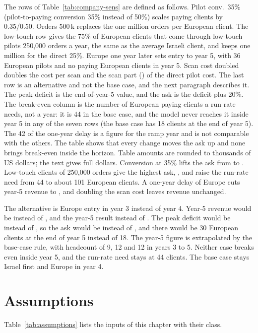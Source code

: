The rows of Table~\ref{tab:company-sens} are defined as follows. Pilot conv.\ 35\% (pilot-to-paying conversion 35\% instead of 50\%) scales paying clients by 0.35/0.50. Orders 500\,k replaces the one million orders per European client. The low-touch row gives the 75\% of European clients that come through low-touch pilots 250,000 orders a year, the same as the average Israeli client, and keeps one million for the direct 25\%. Europe one year later sets entry to year 5, with 36 European pilots and no paying European clients in year 5. Scan cost doubled doubles the cost per scan and the scan part () of the direct pilot cost. The last row is an alternative and not the base case, and the next paragraph describes it. The peak deficit is the end-of-year-5 value, and the ask is the deficit plus 20\%. The break-even column is the number of European paying clients a run rate needs, not a year: it is 44 in the base case, and the model never reaches it inside year 5 in any of the seven rows (the base case has 18 clients at the end of year 5). The 42 of the one-year delay is a figure for the ramp year and is not comparable with the others. The table shows that every change moves the ask up and none brings break-even inside the horizon. Table amounts are rounded to thousands of US dollars; the text gives full dollars. Conversion at 35\% lifts the ask from  to . Low-touch clients of 250,000 orders give the highest ask, , and raise the run-rate need from 44 to about 101 European clients. A one-year delay of Europe cuts year-5 revenue to , and doubling the scan cost leaves revenue unchanged.

The alternative is Europe entry in year 3 instead of year 4. Year-5 revenue would be  instead of , and the year-5 result  instead of . The peak deficit would be  instead of , so the ask would be  instead of , and there would be 30 European clients at the end of year 5 instead of 18. The year-5 figure is extrapolated by the base-case rule, with headcount of 9, 12 and 12 in years 3 to 5. Neither case breaks even inside year 5, and the run-rate need stays at 44 clients. The base case stays Israel first and Europe in year 4.

\section{Assumptions}\label{sec:assumptions}
Table~\ref{tab:assumptions} lists the inputs of this chapter with their class.


